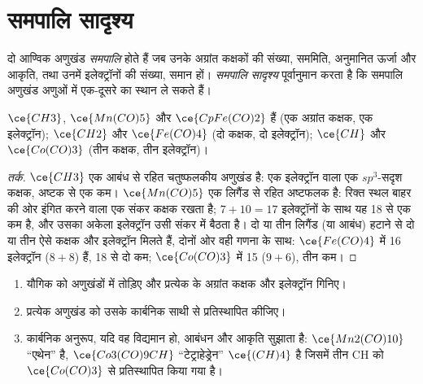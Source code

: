 \section{समपालि सादृश्य}

\begin{definition}[समपालि अणुखंड]\label{def:b3:organometallic-bonding:isolobal}
दो आण्विक अणुखंड \emph{समपालि} होते हैं जब उनके
अग्रांत कक्षकों की संख्या, सममिति, अनुमानित ऊर्जा और आकृति, तथा उनमें
इलेक्ट्रॉनों की संख्या, समान हों। \emph{समपालि
सादृश्य} पूर्वानुमान करता है कि समपालि अणुखंड अणुओं में
एक-दूसरे का स्थान ले सकते हैं।
\end{definition}

\begin{proposition}[समपालि श्रेणी]\label{prop:b3:organometallic-bonding:isolobal}
$\ce{CH3}$, $\ce{Mn(CO)5}$ और $\ce{CpFe(CO)2}$  हैं (एक अग्रांत कक्षक, एक इलेक्ट्रॉन);
$\ce{CH2}$ और $\ce{Fe(CO)4}$ (दो कक्षक, दो इलेक्ट्रॉन); $\ce{CH}$ और $\ce{Co(CO)3}$ (तीन कक्षक,
तीन इलेक्ट्रॉन)।
\end{proposition}

\begin{proof}[तर्क]
$\ce{CH3}$ एक आबंध से रहित चतुष्फलकीय अणुखंड है: एक इलेक्ट्रॉन वाला एक $sp^3$-सदृश कक्षक,
अष्टक से एक कम। $\ce{Mn(CO)5}$ एक लिगैंड से रहित अष्टफलक है:
रिक्त स्थल बाहर की ओर इंगित करने वाला एक संकर कक्षक रखता है; $7 + 10 = 17$ इलेक्ट्रॉनों के साथ यह 18 से एक
कम है, और उसका अकेला इलेक्ट्रॉन उसी संकर में बैठता है। दो या तीन
लिगैंड (या आबंध) हटाने से दो या तीन ऐसे कक्षक और इलेक्ट्रॉन मिलते हैं, दोनों ओर
वही गणना के साथ: $\ce{Fe(CO)4}$ में 16 इलेक्ट्रॉन ($8 + 8$) हैं, 18 से दो कम;
$\ce{Co(CO)3}$ में 15 ($9 + 6$), तीन कम।
\end{proof}

\begin{method}\label{met:b3:organometallic-bonding:isolobal}
\begin{enumerate}
  \item यौगिक को अणुखंडों में तोड़िए और प्रत्येक के अग्रांत कक्षक
        और इलेक्ट्रॉन गिनिए।
  \item प्रत्येक अणुखंड को उसके कार्बनिक  साथी से प्रतिस्थापित कीजिए।
  \item कार्बनिक अनुरूप, यदि वह विद्यमान हो, आबंधन और आकृति सुझाता है:
        $\ce{Mn2(CO)10}$ ``एथेन'' है, $\ce{Co3(CO)9CH}$ ``टेट्राहेड्रेन'' $\ce{(CH)4}$ है जिसमें तीन CH
        को $\ce{Co(CO)3}$ से प्रतिस्थापित किया गया है।
\end{enumerate}
\end{method}

